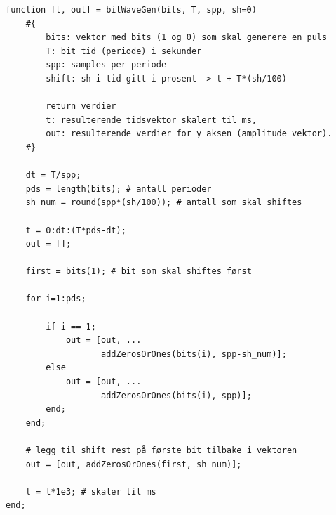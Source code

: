 \begin{verbatim}
function [t, out] = bitWaveGen(bits, T, spp, sh=0)
    #{
        bits: vektor med bits (1 og 0) som skal generere en puls
        T: bit tid (periode) i sekunder
        spp: samples per periode
        shift: sh i tid gitt i prosent -> t + T*(sh/100)

        return verdier
        t: resulterende tidsvektor skalert til ms,
        out: resulterende verdier for y aksen (amplitude vektor).
    #}

    dt = T/spp;
    pds = length(bits); # antall perioder
    sh_num = round(spp*(sh/100)); # antall som skal shiftes

    t = 0:dt:(T*pds-dt);
    out = [];

    first = bits(1); # bit som skal shiftes først

    for i=1:pds;

        if i == 1;
            out = [out, ...
                   addZerosOrOnes(bits(i), spp-sh_num)];
        else
            out = [out, ...
                   addZerosOrOnes(bits(i), spp)];
        end;
    end;

    # legg til shift rest på første bit tilbake i vektoren
    out = [out, addZerosOrOnes(first, sh_num)]; 

    t = t*1e3; # skaler til ms
end;
\end{verbatim}